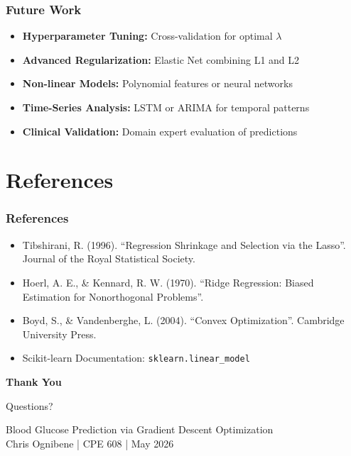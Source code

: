\documentclass[11pt,aspectratio=169]{beamer}
\begin{document}
\begin{frame}
    \frametitle{Future Work}
    \begin{itemize}
        \item \textbf{Hyperparameter Tuning:} Cross-validation for optimal $\lambda$
        \item \textbf{Advanced Regularization:} Elastic Net combining L1 and L2
        \item \textbf{Non-linear Models:} Polynomial features or neural networks
        \item \textbf{Time-Series Analysis:} LSTM or ARIMA for temporal patterns
        \item \textbf{Clinical Validation:} Domain expert evaluation of predictions
    \end{itemize}
\end{frame}

\section{References}

\begin{frame}
    \frametitle{References}
    \begin{itemize}
        \item Tibshirani, R. (1996). ``Regression Shrinkage and Selection via the Lasso''. Journal of the Royal Statistical Society.
        \item Hoerl, A. E., \& Kennard, R. W. (1970). ``Ridge Regression: Biased Estimation for Nonorthogonal Problems''.
        \item Boyd, S., \& Vandenberghe, L. (2004). ``Convex Optimization''. Cambridge University Press.
        \item Scikit-learn Documentation: \texttt{sklearn.linear\_model}
    \end{itemize}
\end{frame}

\begin{frame}
    \centering
    \Large \textbf{Thank You}
    \vspace{1cm}
    
    Questions?
    \vspace{0.5cm}
    
    \small
    Blood Glucose Prediction via Gradient Descent Optimization \\
    Chris Ognibene | CPE 608 | May 2026
\end{frame}
\end{document}
